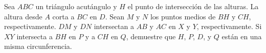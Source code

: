 Sea $ABC$ un triángulo acutángulo y $H$ el punto de intersección de las alturas. La altura desde $A$ corta a $BC$ en $D$. Sean $M$ y $N$ los puntos medios de $BH$ y $CH$, respectivamente. $DM$ y $DN$ intersectan a $AB$ y $AC$ en $X$ y $Y$, respectivamente. Si $XY$ intersecta a $BH$ en $P$ y a $CH$ en $Q$, demuestre que $H$, $P$, $D$, y $Q$ están en una misma circunferencia.
